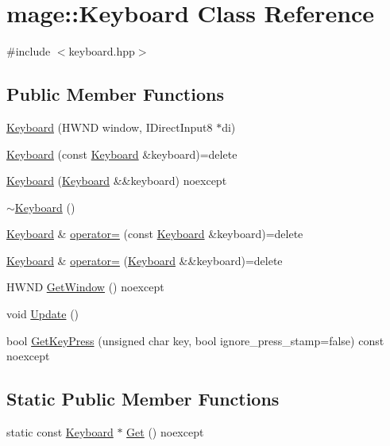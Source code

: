 \hypertarget{classmage_1_1_keyboard}{}\section{mage\+:\+:Keyboard Class Reference}
\label{classmage_1_1_keyboard}


{\ttfamily \#include $<$keyboard.\+hpp$>$}

\subsection*{Public Member Functions}
\begin{DoxyCompactItemize}
\item 
\hyperlink{classmage_1_1_keyboard_ac656f6a3272d07c2897aa383051f0fb8}{Keyboard} (H\+W\+ND window, I\+Direct\+Input8 $\ast$di)
\item 
\hyperlink{classmage_1_1_keyboard_a39d07f8a5e37648ca9eba30aa55146bf}{Keyboard} (const \hyperlink{classmage_1_1_keyboard}{Keyboard} \&keyboard)=delete
\item 
\hyperlink{classmage_1_1_keyboard_a011a8cf9a3a3f50800879f5bdfdead3f}{Keyboard} (\hyperlink{classmage_1_1_keyboard}{Keyboard} \&\&keyboard) noexcept
\item 
\hyperlink{classmage_1_1_keyboard_a80a84ec68749fac71690fb45287d446a}{$\sim$\+Keyboard} ()
\item 
\hyperlink{classmage_1_1_keyboard}{Keyboard} \& \hyperlink{classmage_1_1_keyboard_ae3ba98190c8c14ea894c676888825f35}{operator=} (const \hyperlink{classmage_1_1_keyboard}{Keyboard} \&keyboard)=delete
\item 
\hyperlink{classmage_1_1_keyboard}{Keyboard} \& \hyperlink{classmage_1_1_keyboard_a4f381bc90cc6828b4d0313999b544e6e}{operator=} (\hyperlink{classmage_1_1_keyboard}{Keyboard} \&\&keyboard)=delete
\item 
H\+W\+ND \hyperlink{classmage_1_1_keyboard_a9b80a47a86d190125d104cb2d36f7409}{Get\+Window} () noexcept
\item 
void \hyperlink{classmage_1_1_keyboard_abb5fd91a304f8bbf8b15ab1a277dafaf}{Update} ()
\item 
bool \hyperlink{classmage_1_1_keyboard_a6dbb2b58efa2d3f24c63b44d5b008fad}{Get\+Key\+Press} (unsigned char key, bool ignore\+\_\+press\+\_\+stamp=false) const noexcept
\end{DoxyCompactItemize}
\subsection*{Static Public Member Functions}
\begin{DoxyCompactItemize}
\item 
static const \hyperlink{classmage_1_1_keyboard}{Keyboard} $\ast$ \hyperlink{classmage_1_1_keyboard_a696032d3a0d9bcf1a677a35e1e3d9aa8}{Get} () noexcept
\end{DoxyCompactItemize}

